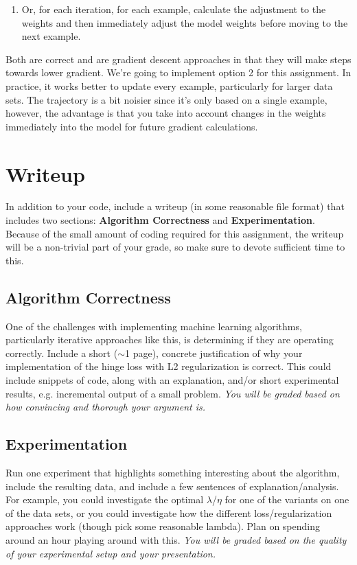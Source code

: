 \documentclass[11pt]{article}
\begin{document}
\begin{itemize}
\begin{enumerate}
\item Or, for each iteration, for each example, calculate the adjustment to the weights and then immediately adjust the model weights before moving to the next example.
\end{enumerate}

Both are correct and are gradient descent approaches in that they will make steps towards lower gradient.  We're going to implement option 2 for this assignment.  In practice, it works better to update every example, particularly for larger data sets.  The trajectory is a bit noisier since it's only based on a single example, however, the advantage is that you take into account changes in the weights immediately into the model for future gradient calculations.

\end{itemize}

\section{Writeup}

In addition to your code, include a writeup (in some reasonable file format) that includes two sections: \textbf{Algorithm Correctness} and \textbf{Experimentation}.  Because of the small amount of coding required for this assignment, the writeup will be a non-trivial part of your grade, so make sure to devote sufficient time to this.

\subsection*{Algorithm Correctness}

One of the challenges with implementing machine learning algorithms, particularly iterative approaches like this, is determining if they are operating correctly.  Include a short ($\sim$1 page), concrete justification of why your implementation of the hinge loss with L2 regularization is correct.  This could include snippets of code, along with an explanation, and/or short experimental results, e.g. incremental output of a small problem.  \textit{You will be graded based on how convincing and thorough your argument is.}



\subsection*{Experimentation}

Run one experiment that highlights something interesting about the algorithm, include the resulting data, and include a few sentences of explanation/analysis.  For example, you could investigate the optimal $\lambda$/$\eta$ for one of the variants on one of the data sets, or you could investigate how the different loss/regularization approaches work (though pick some reasonable lambda).  Plan on spending around an hour playing around with this.  \textit{You will be graded based on the quality of your experimental setup and your presentation.}
\end{document}
